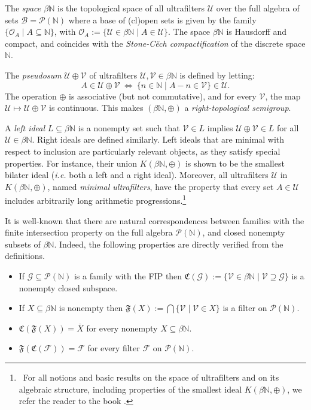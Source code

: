 \documentclass[10pt]{amsart}
\theoremstyle{definition}
\theoremstyle{remark}
\def\N{\mathbb{N}}
\def\B{\mathcal{B}}
\def\F{\mathcal{F}}
\def\G{\mathcal{G}}
\def\U{\mathcal{U}}
\def\V{\mathcal{V}}
\begin{document}
The \emph{space $\beta\N$} is the topological space of all
ultrafilters $\U$ over the full algebra of sets $\B=\mathcal{P}(\N)$ where
a base of (cl)open sets is given by the family
$\{\mathcal{O}_A\mid A\subseteq\N\}$, with
$\mathcal{O}_A:=\{\U\in\beta\N\mid A\in\U\}$.
The space $\beta\N$ is Hausdorff and compact, and coincides with
the \emph{Stone-C\u{e}ch compactification} of the discrete space $\N$.

The \emph{pseudosum} $\U\oplus\V$ of ultrafilters $\U,\V\in\beta\N$ is defined by letting:
$$A\in\U\oplus\V\ \Longleftrightarrow\ \{n\in\N\mid A-n\in\V\}\in\U.$$
The operation $\oplus$ is associative (but not commutative),
and for every $\V$, the map $\U\mapsto\U\oplus\V$ is continuous.
This makes $(\beta\N,\oplus)$ a \emph{right-topological semigroup}.

A \emph{left ideal} $L\subseteq\beta\N$ is a nonempty set
such that $\V\in L$ implies $\U\oplus\V\in L$ for all $\U\in\beta\N$.
Right ideals are defined similarly.
Left ideals that are minimal with respect to inclusion are particularly
relevant objects, as they satisfy special properties. 
For instance, their union $K(\beta\N,\oplus)$
is shown to be the smallest bilater ideal (\emph{i.e.} both a left and a right ideal).
Moreover, all ultrafilters $\U$ in $K(\beta\N,\oplus)$, named \emph{minimal ultrafilters},
have the property
that every set $A\in\U$ includes arbitrarily long arithmetic progressions.\footnote
{~For all notions and basic results on the space of ultrafilters
and on its algebraic structure, including properties of the smallest
ideal $K(\beta\N,\oplus)$, we refer the reader to the book \cite{hs}.}

It is well-known that there are natural correspondences 
between families with the finite intersection
property on the full algebra $\mathcal{P}(\N)$, 
and closed nonempty subsets of $\beta\N$.
Indeed, the following properties are directly verified from the definitions.

\begin{itemize}
\item
If $\G\subseteq\mathcal{P}(\N)$ is a family with the FIP 
then $\mathfrak{C}(\G):=\{\V\in\beta\N\mid\V\supseteq\G\}$
is a nonempty closed subspace.
\item
If $X\subseteq\beta\N$ is nonempty then
$\mathfrak{F}(X):=\bigcap\{\V\mid \V\in X\}$
is a filter on $\mathcal{P}(\N)$.
\item
$\mathfrak{C}(\mathfrak{F}(X))=\overline{X}$ for every
nonempty $X\subseteq\beta\N$. 
\item
$\mathfrak{F}(\mathfrak{C}(\F))=\F$ for every filter $\F$ on $\mathcal{P}(\N)$.
\end{itemize}
\end{document}
